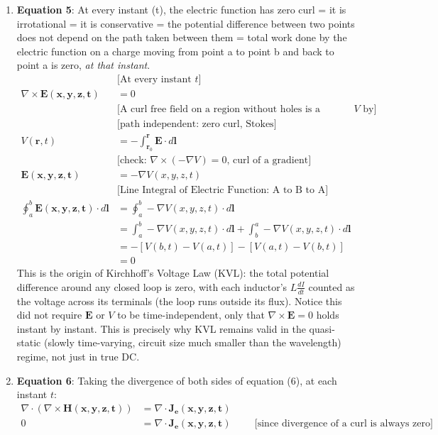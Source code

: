 \begin{enumerate}
  \item \textbf{Equation 5}: At every instant (t), the electric function  has zero
    curl = it is irrotational = it is conservative = the potential difference between
    two points does not depend on the path taken between them = total work done by
    the electric function on a charge moving from point a to point b and back to
    point a is zero, \emph{at that instant}.
    \begin{align*}
      & \text{[At every instant \(t\)]} \\
      \nabla \times \mathbf{E(x,y,z,t)} &= 0 \\
      & \text{[A curl free field on a region without holes is a gradient; define } V \text{ by]} \\
      & \text{[path independent: zero curl, Stokes]} \\
      V(\mathbf{r},t) &= -\int_{\mathbf{r}_0}^{\mathbf{r}} \mathbf{E} \cdot d\mathbf{l} \\
      & \text{[check: } \nabla \times (-\nabla V) = 0 \text{, curl of a gradient]} \\
      \mathbf{E(x,y,z,t)} &= -\nabla V(x,y,z,t) \\
      & \text{[Line Integral of Electric Function: A to B to A]} \\
      \oint_a^b \mathbf{E(x,y,z,t)} \cdot d\mathbf{l} &= \oint_a^b -\nabla V(x,y,z,t) \cdot d\mathbf{l} \\
                                                &= \int_a^b -\nabla V(x,y,z,t) \cdot d\mathbf{l} + \int_b^a -\nabla V(x,y,z,t) \cdot d\mathbf{l} \\
                                                &= -\left[ V(b,t) - V(a,t) \right] - \left[ V(a,t) - V(b,t) \right] \\
                                                &= 0
    \end{align*}
    This is the origin of Kirchhoff's Voltage Law (KVL): the total potential difference
    around any closed loop is zero, with each inductor's \(L\frac{dI}{dt}\) counted as
    the voltage across its terminals (the loop runs outside its flux). Notice this did not require \(\mathbf{E}\) or \(V\)
    to be time-independent, only that \(\nabla\times\mathbf{E}=0\) holds instant by
    instant. This is precisely why KVL remains valid in the quasi-static (slowly
    time-varying, circuit size much smaller than the wavelength) regime, not just in true DC.
  \item \textbf{Equation 6}: Taking the divergence of both sides of
    equation (6), at each instant \(t\):
    \begin{align*}
      \nabla \cdot (\nabla \times \mathbf{H(x,y,z,t)}) &= \nabla \cdot \mathbf{J_e(x,y,z,t)} \\
      0 &= \nabla \cdot \mathbf{J_e(x,y,z,t)} \hspace{1cm} \text{[since divergence of a curl is always zero]} \tag{7}
    \end{align*}


\end{enumerate}
